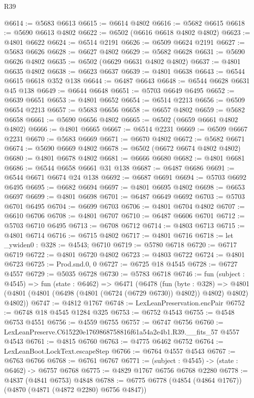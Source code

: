 \begin{lexlean}{R39}
\begin{coremodule}
@6614 := @5683 @6613
@6615 := @6614 @4802
@6616 := @5682 @6615
@6618 := @5690 @6613 @4802
@6622 := @6502 (@6616 @6618 @4802 @4802)
@6623 := @4801 @6622
@6624 := @6514 @2191
@6626 := @6509 @6624 @2191
@6627 := @5683 @6626
@6628 := @6627 @4802
@6629 := @5682 @6628
@6631 := @5690 @6626 @4802
@6635 := @6502 (@6629 @6631 @4802 @4802)
@6637 := @4801 @6635 @4802
@6638 := @6623 @6637
@6639 := @4801 @6638
@6643 := @6544 @6615 @6618 @352 @138
@6644 := @6487 @6643
@6648 := @6544 @6628 @6631 @45 @138
@6649 := @6644 @6648
@6651 := @5703 @6649 @6495
@6652 := @6639 @6651
@6653 := @4801 @6652
@6654 := @6514 @2213
@6656 := @6509 @6654 @2213
@6657 := @5683 @6656
@6658 := @6657 @4802
@6659 := @5682 @6658
@6661 := @5690 @6656 @4802
@6665 := @6502 (@6659 @6661 @4802 @4802)
@6666 := @4801 @6665
@6667 := @6514 @2231
@6669 := @6509 @6667 @2231
@6670 := @5683 @6669
@6671 := @6670 @4802
@6672 := @5682 @6671
@6674 := @5690 @6669 @4802
@6678 := @6502 (@6672 @6674 @4802 @4802)
@6680 := @4801 @6678 @4802
@6681 := @6666 @6680
@6682 := @4801 @6681
@6686 := @6544 @6658 @6661 @31 @138
@6687 := @6487 @6686
@6691 := @6544 @6671 @6674 @24 @138
@6692 := @6687 @6691
@6694 := @5703 @6692 @6495
@6695 := @6682 @6694
@6697 := @4801 @6695 @4802
@6698 := @6653 @6697
@6699 := @4801 @6698
@6701 := @6487 @6649 @6692
@6703 := @5703 @6701 @6495
@6704 := @6699 @6703
@6706 := @4801 @6704 @4802
@6707 := @6610 @6706
@6708 := @4801 @6707
@6710 := @6487 @6606 @6701
@6712 := @5703 @6710 @6495
@6713 := @6708 @6712
@6714 := @4803 @6713
@6715 := @4801 @6714
@6716 := @6715 @4802
@6717 := @4801 @6716
@6718 := let _ywiden0 : @328 := @4543; @6710
@6719 := @5780 @6718
@6720 := @6717 @6719
@6722 := @4801 @6720 @4802
@6723 := @4803 @6722
@6724 := @4801 @6723
@6725 := Prod.snd.{0, 0}
@6727 := @6725 @18 @4545
@6728 := @6727 @4557
@6729 := @5035 @6728
@6730 := @5783 @6718
@6746 := fun (subject : @4545) =>
  fun (state : @6462) =>
  @6471
    (@6478
      (fun (byte : @328) =>
      @4801 (@4801 (@4801 (@6498 (@4801 (@6724 (@6729 @6730)) @4802)) @4802) @4802) @4802))
@6747 := @4812 @1767
@6748 := LexLeanPreservation.encPair
@6752 := @6748 @18 @4545 @1284 @325
@6753 := @6752 @4543
@6755 := @4548 @6753 @4551
@6756 := @4559 @6755
@6757 := @6747 @6756
@6760 := LexLeanPreserve.C615220e1769868758816f61a54a2e4b1.R39.__fits_57 @4557 @4543
@6761 := @4815 @6760
@6763 := @4775 @6462 @6752
@6764 := LexLeanBoot.LockText.escapeStep
@6766 := @6764 @4557 @4543
@6767 := @6763 @6766
@6768 := @6761 @6767
@6771 := (subject : @4545) -> (state : @6462) -> @6757 @6768
@6775 := @4829 @1767 @6756 @6768 @2280
@6778 := @4837 (@4841 @6753) @4848
@6788 := @6775 @6778 (@4854 (@4864 @1767)) (@4870 (@4871 (@4872 @2280) @6756 @4847))

\end{coremodule}
\end{lexlean}
